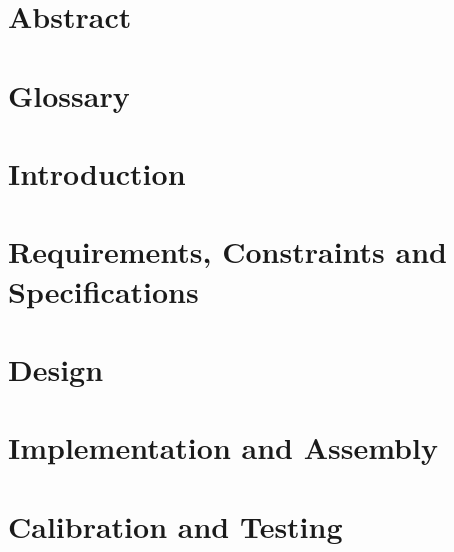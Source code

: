 \documentclass[12pt]{article}
\begin{document}
	
	
	\setcounter{page}{0}
	\newpage
	
	\section*{Abstract}
	
	\pagebreak
	
	\tableofcontents
	\pagebreak
	
	\listoffigures
	\pagebreak
	\listoftables
	\pagebreak
	\section*{Glossary}
	
	\pagebreak
	
	\section{Introduction}
	\label{sec:intro}
	
	\pagebreak
	
	\section{Requirements, Constraints and Specifications}
	\label{sec:requirements}
	
	\pagebreak
	
	\section{Design}
	\label{sec:design}
	
	\pagebreak
	
 	\section{Implementation and Assembly}
 	\label{sec:implementation}
	
	\pagebreak
	
	\section{Calibration and Testing}
	\label{sec:calibration}
	
	\pagebreak
	
	\printbibliography
	\pagebreak
	
	\appendix
	

	
\end{document}
